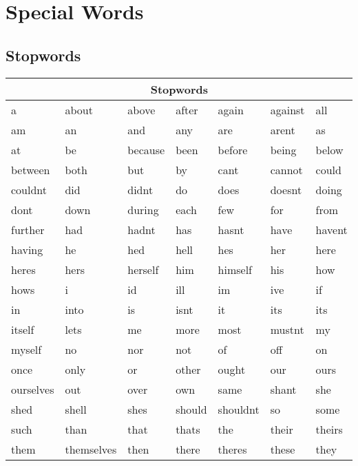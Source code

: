 \chapter{Special Words}
\label{apx:special_words}


\section{Stopwords}
\begin{table}[H]
    \begin{tabular}{| l | l | l | l | l | l | l |}
        \hline
        \multicolumn{7}{|c|}{\textbf{Stopwords}} \\ \hline
        a & about & above & after & again & against & all \\ \hline
        am & an & and & any & are & arent & as \\ \hline
        at & be & because & been & before & being & below \\ \hline
        between & both & but & by & cant & cannot & could \\ \hline
        couldnt & did & didnt & do & does & doesnt & doing \\ \hline
        dont & down & during & each & few & for & from \\ \hline
        further & had & hadnt & has & hasnt & have & havent \\ \hline
        having & he & hed & hell & hes & her & here \\ \hline
        heres & hers & herself & him & himself & his & how \\ \hline
        hows & i & id & ill & im & ive & if \\ \hline
        in & into & is & isnt & it & its & its \\ \hline
        itself & lets & me & more & most & mustnt & my \\ \hline
        myself & no & nor & not & of & off & on \\ \hline
        once & only & or & other & ought & our & ours \\ \hline
        ourselves & out & over & own & same & shant & she \\ \hline
        shed & shell & shes & should & shouldnt & so & some\\ \hline
        such & than & that & thats & the & their & theirs\\ \hline
        them & themselves & then & there & theres & these & they\\ \hline

\end{tabular}
\end{table}
